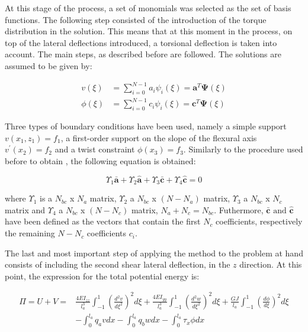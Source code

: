 \noindent At this stage of the process, a set of monomials was selected as the set of basis functions.
The following step consisted of the introduction of the torque distribution in the solution. This means that at this moment in the process, on top of the lateral deflections introduced, a torsional deflection is taken into account. The main steps, as described before are followed. The solutions are assumed to be given by:

\begin{equation}
    \begin{aligned}
v(\xi) &=\sum_{i=0}^{N-1} a_{i} \psi_{i}(\xi)=\mathbf{a}^{T} \mathbf{\Psi}(\xi) \\
\phi(\xi) &=\sum_{i=0}^{N-1} c_{i} \psi_{i}(\xi)=\mathbf{c}^{T} \mathbf{\Psi}(\xi)
\end{aligned}
\end{equation}


\noindent Three types of boundary conditions have been used, namely a simple support $v(x_1,z_1) = f_1$, a first-order support on the slope of the flexural axis $v^{\prime}(x_2)=f_2$ and a twist constraint $\phi(x_3)=f_3$. Similarly to the procedure used before to obtain , the following equation is obtained:

\begin{equation}
\label{eq:new_form_of_BC_torsion}
    \Upsilon_{1} \mathbf{\bar{a}}+\Upsilon_{2} \mathbf{\hat{a}}+\Upsilon_{3} \mathbf{\bar{c}}+\Upsilon_{4} \mathbf{\hat{c}}=0
\end{equation}

\noindent where $\Upsilon_{1}$ is a $N_{bc}$ x $N_a$ matrix, $\Upsilon_{2}$ a $N_{bc}$ x $(N - N_a)$ matrix, $\Upsilon_{3}$ a $N_{bc}$ x $N_c$ matrix and $\Upsilon_{4}$ a $N_{bc}$ x $(N - N_c)$ matrix, $N_a + N_c=N_{bc}$. Futhermore, $\mathbf{\bar{c}} \text{ and } \mathbf{\hat{c}}$ have been defined as the vectors that contain the first $N_c$ coefficients, respectively the remaining $N-N_c$ coefficients $c_i$. 

\noindent The last and most important step of applying the method to the problem at hand consists of including the second shear lateral deflection, in the $z$ direction. At this point, the expression for the total potential energy is:

\begin{equation}
    \label{eq:total_potential_energy_final}
    \begin{aligned}
\Pi=U+V=& \frac{4 E I_{z z}}{l_{a}^{3}} \int_{-1}^{1}\left(\frac{d^{2} v}{d \xi^{2}}\right)^{2} d \xi+\frac{4 E I_{y y}}{l_{a}^{3}} \int_{-1}^{1}\left(\frac{d^{2} w}{d \xi^{2}}\right)^{2} d \xi+\frac{G J}{l_{a}} \int_{-1}^{1}\left(\frac{d \phi}{d \xi}\right)^{2} d \xi \\
&-\int_{0}^{l_{a}} q_{a} v d x-\int_{0}^{l_{a}} q_{b} w d x-\int_{0}^{l_{a}} \tau_{x} \phi d x
\end{aligned}
\end{equation}

